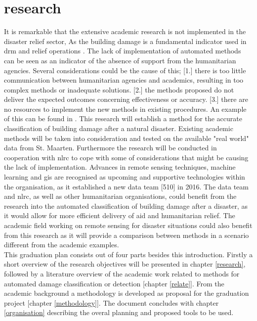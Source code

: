 \section{research}
It is remarkable that the extensive academic research is not implemented in the disaster relief sector, As the building damage is a fundamental indicator used in \ac{drm} and relief operations \citep{Schweier2006}. The lack of implementation of automated methods can be seen as an indicator of the absence of support from the humanitarian agencies. Several considerations could be the cause of this; [1.] there is too little communication between humanitarian agencies and academics, resulting in too complex methods or inadequate solutions. [2.] the methods proposed do not deliver the expected outcomes concerning effectiveness or accuracy. [3.] there are no resources to implement the new methods in existing procedures. An example of this can be found in \citet{Ajmar2011}. This research will establish a method for the accurate classification of building damage after a natural disaster. Existing academic methods will be taken into consideration and tested on the available "real world" data from St. Maarten. Furthermore the research will be conducted in cooperation with \ac{nlrc} to cope with some of considerations that might be causing the lack of implementation. Advances in remote sensing techniques, machine learning and \ac{gis} are recognised as upcoming and supportive technologies within the organisation, as it established a new data team [510] in 2016. The data team and \ac{nlrc}, as well as other humanitarian organisations, could benefit from the research into the automated classification of building damage after a disaster, as it would allow for more efficient delivery of aid and humanitarian relief. The academic field working on remote sensing for disaster situations could also benefit from this research as it will provide a comparison between methods in a scenario different from the academic examples.
\\

This graduation plan consists out of four parts besides this introduction. Firstly a short overview of the research objectives will be presented in chapter \ref{research}, followed by a literature overview of the academic work related to methods for automated damage classification or detection [chapter \ref{relate}]. From the academic background a methodology is developed as proposal for the graduation project [chapter \ref{methodology}]. The document concludes with chapter \ref{organisation} describing the overal planning and proposed tools to be used. 
